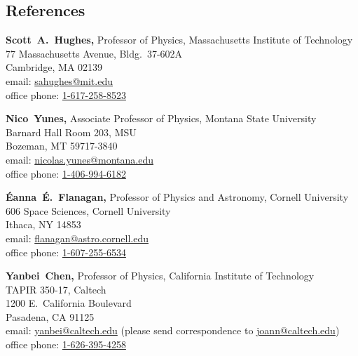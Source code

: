 \documentclass[margin,line]{res}
\begin{document}
\begin{resume}

\section{\sc References}
\vspace*{.05in}
\parbox{\textwidth}{%
{\bf Scott~A.~Hughes,} Professor of Physics, Massachusetts Institute of Technology \\
77 Massachusetts Avenue, Bldg.\ 37-602A \\
Cambridge, MA 02139 \\
email: \href{mailto:sahughes@mit.edu}{sahughes@mit.edu} \\
office phone: \href{tel:1-617-258-8523}{1-617-258-8523}}
\par
\parbox{\textwidth}{%
{\bf Nico~Yunes,} Associate Professor of Physics, Montana State University\\
Barnard Hall Room 203, MSU\\
Bozeman, MT 59717-3840\\
email: \href{mailto:nicolas.yunes@montana.edu}{nicolas.yunes@montana.edu} \\
office phone: \href{tel:1-406-994-6182}{1-406-994-6182}}
\par
\parbox{\textwidth}{%
{\bf {\'E}anna~{\'E}.~Flanagan,} Professor of Physics and Astronomy,
Cornell University\\
606 Space Sciences, Cornell University\\
Ithaca, NY 14853\\
email: \href{mailto:flanagan@astro.cornell.edu}{flanagan@astro.cornell.edu}\\
office phone: \href{tel:1-607-255-6534}{1-607-255-6534}}
\par
\parbox{\textwidth}{%
{\bf Yanbei~Chen,} Professor of Physics,
California Institute of Technology\\
TAPIR 350-17, Caltech\\
1200 E.\ California Boulevard\\
Pasadena, CA 91125\\
email: \href{mailto:yanbei@caltech.edu}{yanbei@caltech.edu}
(please send correspondence to \href{mailto:joann@caltech.edu}{joann@caltech.edu})
\\
office phone: \href{tel:1-626-395-4258}{1-626-395-4258}}

\end{resume}
\end{document}
